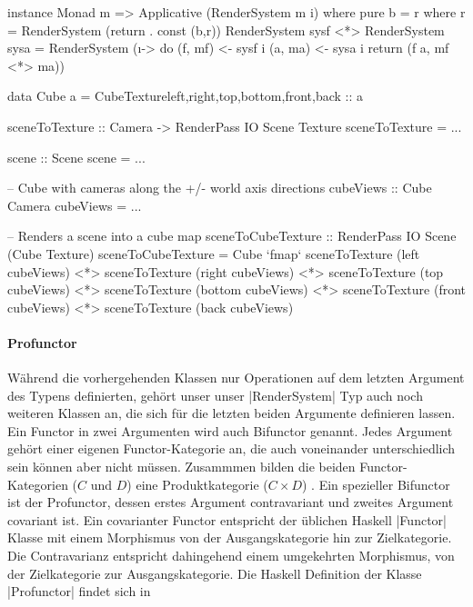 \begin{haskell}[label={lst:rendersystem-applicative},caption={Applicative Instanz für RenderSystem},float,floatplacement=H]
instance Monad m => Applicative (RenderSystem m i) where
  pure b = r where r = RenderSystem (return . const (b,r))
  RenderSystem sysf <*> RenderSystem sysa = RenderSystem (\i -> do
    (f, mf) <- sysf i
    (a, ma) <- sysa i
    return (f a, mf <*> ma))
\end{haskell}

\begin{haskell}[label={lst:rendersystem-applicative-beispiel},caption={Applicative RenderSystem Beispiel},float,floatplacement=H]
data Cube a = CubeTexture{left,right,top,bottom,front,back :: a}

sceneToTexture :: Camera -> RenderPass IO Scene Texture
sceneToTexture = ...

scene :: Scene
scene = ...

-- Cube with cameras along the +/- world axis directions
cubeViews :: Cube Camera
cubeViews = ...

-- Renders a scene into a cube map
sceneToCubeTexture :: RenderPass IO Scene (Cube Texture)
sceneToCubeTexture = Cube
	`fmap` sceneToTexture (left cubeViews)
	<*> sceneToTexture (right  cubeViews)
	<*> sceneToTexture (top    cubeViews)
	<*> sceneToTexture (bottom cubeViews)
	<*> sceneToTexture (front  cubeViews)
	<*> sceneToTexture (back   cubeViews)
\end{haskell}



\paragraph{Profunctor}
Während die vorhergehenden Klassen nur Operationen auf dem letzten Argument des Typens definierten, gehört unser unser |RenderSystem| Typ auch noch weiteren Klassen an, die sich für die letzten beiden Argumente definieren lassen. Ein Functor in zwei Argumenten wird auch Bifunctor genannt. Jedes Argument gehört einer eigenen Functor-Kategorie an, die auch voneinander unterschiedlich sein können aber nicht müssen. Zusammmen bilden die beiden Functor-Kategorien ($C$ und $D$) eine Produktkategorie ($C \times D$) \parencite{MacLane1998}. Ein spezieller Bifunctor ist der Profunctor, dessen erstes Argument contravariant und zweites Argument covariant ist. Ein covarianter Functor entspricht der üblichen Haskell |Functor| Klasse mit einem Morphismus von der Ausgangskategorie hin zur Zielkategorie. Die Contravarianz entspricht dahingehend einem umgekehrten Morphismus, von der Zielkategorie zur Ausgangskategorie. Die Haskell Definition der Klasse |Profunctor| findet sich in 

